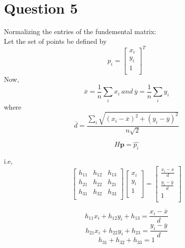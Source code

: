 \documentclass{article}
\begin{document}
\section*{Question 5}

Normalizing the entries of the fundemental matrix: \\

Let the set of points be defined by \\

\[
p_{i} = \begin{bmatrix}
    x_{i}\\
    y_{i}\\
    1\\
\end{bmatrix}^{T}
\]
Now, 
\[
 \overline{x} = \frac{1}{n}\sum_{i}x_{i}\  and\   \overline{y} = \frac{1}{n}\sum_{i}y_{i}
 \]
 where
 \[
 \overline{d} = \frac{\sum_{i}\sqrt{(x_{i} - \overline{x})^{2} + (y_{i} - \overline{y})^{2}}}{n\sqrt{2}}
 \]

 \[
 H\textbf{p} = \hat{p_{i}}
 \]

 i.e,
 \[
\begin{bmatrix}
    h_{11} &  h_{12} &  h_{13}\\
    h_{21} &  h_{22} &  h_{21}\\
    h_{31} &  h_{32} &  h_{33}\\
\end{bmatrix} \begin{bmatrix}
    x_{i}\\
    y_{i}\\
    1\\
\end{bmatrix} = \begin{bmatrix}
    \frac{x_{i} - \overline{x}}{d}\\
    \frac{y_{i} - \overline{y}}{d}\\
    1\\
\end{bmatrix}
\]

\begin{equation}
h_{11}x_{i}  + h_{12}y_{i} +  h_{13} =     \frac{x_{i} - \overline{x}}{d}
\end{equation}
\begin{equation}
h_{21}x_{i}  + h_{22}y_{i} +  h_{23} =     \frac{y_{i} - \overline{y}}{d}
\end{equation}
\begin{equation}
h_{31}  + h_{32} +  h_{33} =     1
\end{equation}
\end{document}
